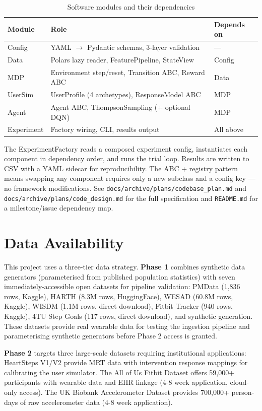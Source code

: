 \documentclass[11pt,a4paper]{article}
\begin{document}
\begin{table}[H]
\centering
\caption{Software modules and their dependencies}
\begin{tabular}{lll}
\toprule
Module & Role & Depends on \\
\midrule
Config & YAML $\rightarrow$ Pydantic schemas, 3-layer validation & --- \\
Data & Polars lazy reader, FeaturePipeline, StateView & Config \\
MDP & Environment step/reset, Transition ABC, Reward ABC & Data \\
UserSim & UserProfile (4 archetypes), ResponseModel ABC & MDP \\
Agent & Agent ABC, ThompsonSampling (+ optional DQN) & MDP \\
Experiment & Factory wiring, CLI, results output & All above \\
\bottomrule
\end{tabular}
\end{table}

The ExperimentFactory reads a composed experiment config, instantiates
each component in dependency order, and runs the trial loop. Results are
written to CSV with a YAML sidecar for reproducibility. The ABC + registry
pattern means swapping any component requires only a new subclass and a
config key --- no framework modifications. See
\texttt{docs/archive/plans/codebase\_plan.md} and \texttt{docs/archive/plans/code\_design.md}
for the full specification and \texttt{README.md} for a milestone/issue
dependency map.

\section{Data Availability}
\label{sec:data}

This project uses a three-tier data strategy. \textbf{Phase 1} combines synthetic data generators (parameterised from published population statistics) with seven immediately-accessible open datasets for pipeline validation: PMData (1,836 rows, Kaggle), HARTH (8.3M rows, HuggingFace), WESAD (60.8M rows, Kaggle), WISDM (1.1M rows, direct download), Fitbit Tracker (940 rows, Kaggle), 4TU Step Goals (117 rows, direct download), and synthetic generation. These datasets provide real wearable data for testing the ingestion pipeline and parameterising synthetic generators before Phase 2 access is granted.

\textbf{Phase 2} targets three large-scale datasets requiring institutional applications: HeartSteps V1/V2 \cite{klasnja2019heartsteps,klasnja2022heartsteps} provide MRT data with intervention response mappings for calibrating the user simulator. The All of Us Fitbit Dataset \cite{patten2026allofus} offers 59,000+ participants with wearable data and EHR linkage (4-8 week application, cloud-only access). The UK Biobank Accelerometer Dataset \cite{williamson2024ukbiobank} provides 700,000+ person-days of raw accelerometer data (4-8 week application).
\end{document}
